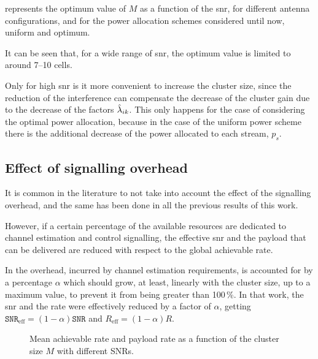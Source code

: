  represents the optimum value of $M$ as a function of the
\gls{snr}, for different antenna configurations, and for the power allocation
schemes considered until now, uniform and optimum.

It can be seen that, for a wide range of \gls{snr}, the optimum value is limited
to around 7--10 cells.

Only for high \gls{snr} is it more convenient to increase the cluster size,
since the reduction of the interference can compensate the decrease of the
cluster gain due to the decrease of the factors $\hat{\lambda}_{ik}$. This only
happens for the case of considering the optimal power allocation, because in the
case of the uniform power scheme there is the additional decrease of the power
allocated to each stream, $p_s$.

\subsection{Effect of signalling overhead}\label{ssec:achiev_signal_overhead}

It is common in the literature to not take into account the effect of the
signalling overhead, and the same has been done in all the previous results of
this work.

However, if a certain percentage of the available resources are dedicated to
channel estimation and control signalling, the effective \gls{snr} and the
payload that can be delivered are reduced with respect to the global achievable
rate.

In \cite{lozano13} the overhead, incurred by channel estimation requirements, is
accounted for by a percentage $\alpha$ which should grow, at least, linearly
with the cluster size, up to a maximum value, to prevent it from being greater
than 100\,\%. In that work, the \gls{snr} and the rate were effectively reduced
by a factor of $\alpha$, getting $\mathtt{SNR}_{\text{eff}}=\left(1-\alpha
\right)\mathtt{SNR}$ and $R_{\text{eff}} = \left(1-\alpha\right)R$.

\begin{figure}[t]
\begin{center}
    \hspace*{-1mm}
\end{center}
\caption{Mean achievable rate and payload rate as a function of the cluster size
$M$ with different SNRs.}
\label{fig:signal_overhead}
\end{figure}

